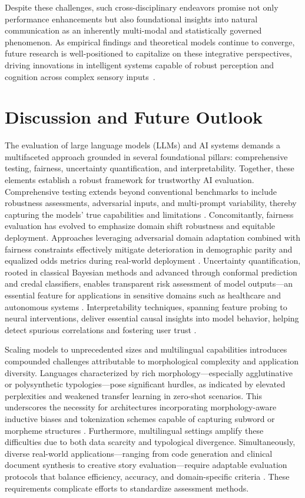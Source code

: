 \documentclass[sigconf]{acmart}
\begin{document}
Despite these challenges, such cross-disciplinary endeavors promise not only performance enhancements but also foundational insights into natural communication as an inherently multi-modal and statistically governed phenomenon. As empirical findings and theoretical models continue to converge, future research is well-positioned to capitalize on these integrative perspectives, driving innovations in intelligent systems capable of robust perception and cognition across complex sensory inputs~\cite{ref51,ref52}.

\section{Discussion and Future Outlook}

The evaluation of large language models (LLMs) and AI systems demands a multifaceted approach grounded in several foundational pillars: comprehensive testing, fairness, uncertainty quantification, and interpretability. Together, these elements establish a robust framework for trustworthy AI evaluation. Comprehensive testing extends beyond conventional benchmarks to include robustness assessments, adversarial inputs, and multi-prompt variability, thereby capturing the models’ true capabilities and limitations \cite{ref25}. Concomitantly, fairness evaluation has evolved to emphasize domain shift robustness and equitable deployment. Approaches leveraging adversarial domain adaptation combined with fairness constraints effectively mitigate deterioration in demographic parity and equalized odds metrics during real-world deployment \cite{ref41}. Uncertainty quantification, rooted in classical Bayesian methods and advanced through conformal prediction and credal classifiers, enables transparent risk assessment of model outputs—an essential feature for applications in sensitive domains such as healthcare and autonomous systems \cite{ref35}. Interpretability techniques, spanning feature probing to neural interventions, deliver essential causal insights into model behavior, helping detect spurious correlations and fostering user trust \cite{ref36}.

Scaling models to unprecedented sizes and multilingual capabilities introduces compounded challenges attributable to morphological complexity and application diversity. Languages characterized by rich morphology—especially agglutinative or polysynthetic typologies—pose significant hurdles, as indicated by elevated perplexities and weakened transfer learning in zero-shot scenarios. This underscores the necessity for architectures incorporating morphology-aware inductive biases and tokenization schemes capable of capturing subword or morpheme structures \cite{ref38}. Furthermore, multilingual settings amplify these difficulties due to both data scarcity and typological divergence. Simultaneously, diverse real-world applications—ranging from code generation and clinical document synthesis to creative story evaluation—require adaptable evaluation protocols that balance efficiency, accuracy, and domain-specific criteria \cite{ref12,ref15,ref31}. These requirements complicate efforts to standardize assessment methods.
\end{document}
